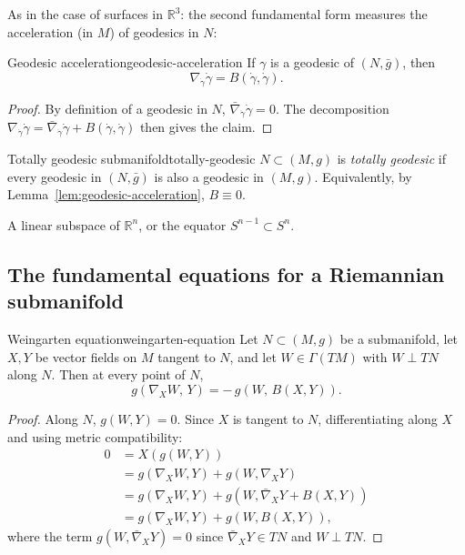 


As in the case of surfaces in $\mathbb{R}^3$: the second fundamental form measures the acceleration (in $M$) of geodesics in $N$:

\begin{colorlem}{Geodesic acceleration}{geodesic-acceleration}
If $\gamma$ is a geodesic of $(N, \bar g)$, then
\[
\nabla_{\dot\gamma} \dot\gamma = B(\dot\gamma, \dot\gamma).
\]
\end{colorlem}

\begin{proof}
By definition of a geodesic in $N$, $\bar\nabla_{\dot\gamma} \dot\gamma = 0$. The decomposition $\nabla_{\dot\gamma} \dot\gamma = \bar\nabla_{\dot\gamma} \dot\gamma + B(\dot\gamma, \dot\gamma)$ then gives the claim.
\end{proof}

\begin{colordef}{Totally geodesic submanifold}{totally-geodesic}
$N \subset (M, g)$ is \emph{totally geodesic} if every geodesic in $(N, \bar g)$ is also a geodesic in $(M, g)$. Equivalently, by Lemma~\ref{lem:geodesic-acceleration}, $B \equiv 0$.
\end{colordef}

\begin{colexample}{}{}
A linear subspace of $\mathbb{R}^n$, or the equator $S^{n-1} \subset S^n$.
\end{colexample}

\subsection{The fundamental equations for a Riemannian submanifold}

\begin{colortheo}{Weingarten equation}{weingarten-equation}
Let $N \subset (M, g)$ be a submanifold, let $X, Y$ be vector fields on $M$ tangent to $N$, and let $W \in \Gamma(TM)$ with $W \perp TN$ along $N$. Then at every point of $N$,
\[
g(\nabla_X W,\, Y) = -\,g(W,\, B(X, Y)).
\]
\end{colortheo}

\begin{proof}
Along $N$, $g(W, Y) = 0$. Since $X$ is tangent to $N$, differentiating along $X$ and using metric compatibility:
\begin{align*}
0 &= X(g(W, Y)) \\
&= g(\nabla_X W, Y) + g(W, \nabla_X Y) \\
&= g(\nabla_X W, Y) + g(W, \bar\nabla_X Y + B(X, Y)) \\
&= g(\nabla_X W, Y) + g(W, B(X, Y)),
\end{align*}
where the term $g(W, \bar\nabla_X Y) = 0$ since $\bar\nabla_X Y \in TN$ and $W \perp TN$. \qedhere
\end{proof}



